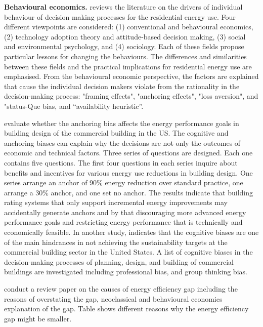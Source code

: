 \documentclass[preprint,12pt,3p]{elsarticle}
\begin{document}
\noindent
\textbf{Behavioural economics.}
\citeauthor{wilson2007} \citeyearpar{wilson2007} reviews the literature on the drivers of individual behaviour of decision making processes for the residential energy use. Four different viewpoints are considered: (1) conventional and behavioural economics, (2) technology adoption theory and attitude-based decision making, (3) social and environmental psychology, and (4) sociology. Each of these fields propose particular lessons for changing the behaviours. The differences and similarities between these fields and the practical implications for residential energy use are emphasised. From the behavioural economic perspective, the factors are explained that cause the individual decision makers violate from the rationality in the decision-making process: "framing effects", "anchoring effects", "loss aversion", and "status-Que bias, and “availability heuristic”.

 \citeauthor{klotz2010} \citeyearpar{klotz2010}  evaluate whether the anchoring bias affects the energy performance goals in building design of the commercial building in the US. The cognitive and anchoring biases can explain why the decisions are not only the outcomes of economic and technical factors. Three series of questions are designed. Each one contains five questions. The first four questions in each series inquire about benefits and incentives for various energy use reductions in building design. One series arrange an anchor of 90\% energy reduction over standard practice, one arrange a 30\% anchor, and one set no anchor. The results indicate that building rating systems that only support incremental energy improvements may accidentally generate anchors and by that discouraging more advanced energy performance goals and restricting energy performance that is technically and economically feasible. In another study, \citeauthor{klotz2011} \citeyearpar{klotz2011} indicates that the cognitive biases are one of the main hindrances in not achieving the sustainability targets at the commercial building sector in the United States. A list of cognitive biases in the decision-making processes of planning, design, and building of commercial buildings are investigated including professional bias, and group thinking bias. 
 
 \citeauthor{gillingham2014} \citeyearpar{gillingham2014} conduct a review paper on the causes of energy efficiency gap including the reasons of overstating the gap, neoclassical and behavioural economics explanation of the gap. Table shows different reasons why the energy efficiency gap might be smaller. 
 
\end{document}
